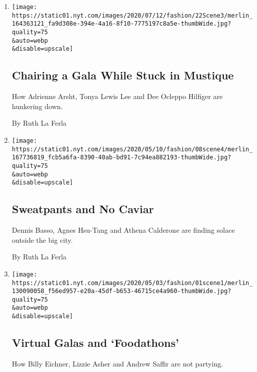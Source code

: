 \begin{enumerate}
\def\labelenumi{\arabic{enumi}.}
\item
  \href{/2020/05/25/style/chairing-a-gala-while-stuck-in-mustique.html}{}

  \texttt{[image: https://static01.nyt.com/images/2020/07/12/fashion/22Scene3/merlin\_164363121\_fa9d308e-394e-4a16-8f10-7775197c8a5e-thumbWide.jpg?quality=75\\\&auto=webp\\\&disable=upscale]}

  \hypertarget{chairing-a-gala-while-stuck-in-mustique}{%
  \subsection{Chairing a Gala While Stuck in
  Mustique}\label{chairing-a-gala-while-stuck-in-mustique}}

  How Adrienne Arsht, Tonya Lewis Lee and Dee Ocleppo Hilfiger are
  hunkering down.

  By Ruth La Ferla
\item
  \href{/2020/05/08/style/sweatpants-and-no-caviar.html}{}

  \texttt{[image: https://static01.nyt.com/images/2020/05/10/fashion/08scene4/merlin\_167736819\_fcb5a6fa-8390-40ab-bd91-7c94ea882193-thumbWide.jpg?quality=75\\\&auto=webp\\\&disable=upscale]}

  \hypertarget{sweatpants-and-no-caviar}{%
  \subsection{Sweatpants and No Caviar}\label{sweatpants-and-no-caviar}}

  Dennis Basso, Agnes Hsu-Tang and Athena Calderone are finding solace
  outside the big city.

  By Ruth La Ferla
\item
  \href{/2020/05/01/style/virtual-galas-and-foodathons.html}{}

  \texttt{[image: https://static01.nyt.com/images/2020/05/03/fashion/01scene1/merlin\_130090058\_f56ed957-e20a-45df-b653-46715ce4a960-thumbWide.jpg?quality=75\\\&auto=webp\\\&disable=upscale]}

  \hypertarget{virtual-galas-and-foodathons}{%
  \subsection{Virtual Galas and
  `Foodathons'}\label{virtual-galas-and-foodathons}}

  How Billy Eichner, Lizzie Asher and Andrew Saffir are not partying.


\end{enumerate}
